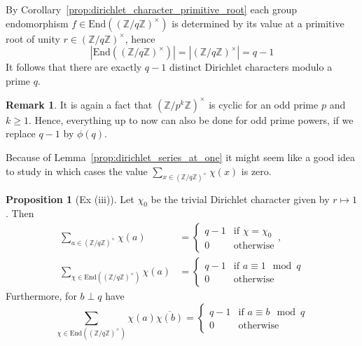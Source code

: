 \documentclass{scrartcl}
\newcommand{\Z}{\mathbb{Z}}
\newcommand{\units}{\times}
\theoremstyle{definition}
\newtheorem{remark}[definition]{Remark}
\newtheorem{proposition}[definition]{Proposition}
\begin{document}
By Corollary~\ref{prop:dirichlet_character_primitive_root} each group endomorphism $f \in \mathrm{End}((\Z/q\Z)^\units)$ is determined by its value at a primitive root of unity $r \in (\Z/q\Z)^\units$, hence
\begin{equation*}
    |\mathrm{End}((\Z/q\Z)^\units)| = |(\Z/q\Z)^\units| = q - 1
\end{equation*}
It follows that there are exactly $q - 1$ distinct Dirichlet characters modulo a prime $q$.
\begin{remark}
    It is again a fact that $(\Z/p^k\Z)^\units$ is cyclic for an odd prime $p$ and $k \geq 1$.
    Hence, everything up to now can also be done for odd prime powers, if we replace $q - 1$ by $\phi(q)$.
\end{remark}
Because of Lemma~\ref{prop:dirichlet_series_at_one} it might seem like a good idea to study in which cases the value $\sum_{x \in (\Z/q\Z)^\units} \chi(x)$ is zero.
\begin{proposition}[Ex (iii)]
    Let $\chi_0$ be the trivial Dirichlet character given by $r \mapsto 1$.
    Then
    \begin{align*}
        \sum_{a \in (\Z/q\Z)^\units} \chi(a) &= \begin{cases}
            q - 1 & \text{if $\chi = \chi_0$} \\
            0 & \text{otherwise}
        \end{cases}, \\
        \sum_{\chi \in \mathrm{End}((\Z/q\Z)^\units)} \chi(a) &= \begin{cases}
            q - 1 & \text{if $a \equiv 1 \mod q$} \\
            0 & \text{otherwise}
        \end{cases}
    \end{align*}
    Furthermore, for $b \perp q$ have
    \begin{equation*}
        \sum_{\chi \in \mathrm{End}((\Z/q\Z)^\units)} \chi(a)\overline{\chi(b)} = \begin{cases}
            q - 1 & \text{if $a \equiv b \mod q$} \\
            0 & \text{otherwise}
        \end{cases}
    \end{equation*}
\end{proposition}
\end{document}
